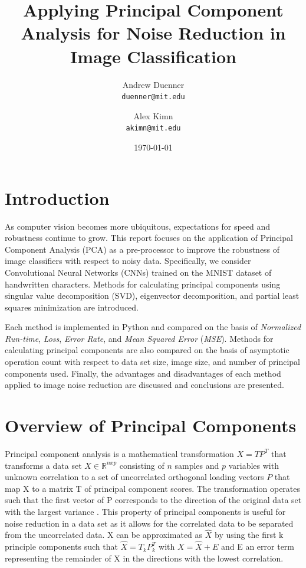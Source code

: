 \documentclass[12pt]{article}
\title{Applying Principal Component Analysis for Noise Reduction in Image Classification
}
\author{Andrew Duenner \\\texttt{duenner@mit.edu} \and Alex Kimn \\\texttt{akimn@mit.edu}}
\date{\today}
\begin{document}
\maketitle

\pagebreak
\tableofcontents

\pagebreak
\section{Introduction}\label{1}
As computer vision becomes more ubiquitous, expectations for speed and robustness continue to grow. This report focuses on the application of Principal Component Analysis (PCA) as a pre-processor to improve the robustness of image classifiers with respect to noisy data. Specifically, we consider Convolutional Neural Networks (CNNs) trained on the MNIST dataset of handwritten characters. Methods for calculating principal components using singular value decomposition (SVD), eigenvector decomposition, and partial least squares minimization are introduced. 

Each method is implemented in Python and compared on the basis of \textit{Normalized Run-time}, \textit{Loss},  \textit{Error Rate}, and \textit{Mean Squared Error} (\textit{MSE}). Methods for calculating principal components are also compared on the basis of asymptotic operation count with respect to data set size, image size, and number of principal components used. Finally, the advantages and disadvantages of each method applied to image noise reduction are discussed and conclusions are presented.


\section{Overview of Principal Components}\label{2}
Principal component analysis is a mathematical transformation $X=TP^T$ that transforms a data set $X \in \mathbb{R}^{nxp}$ consisting of $n$ samples and $p$ variables with unknown correlation to a set of uncorrelated orthogonal loading vectors $P$  that map X to a matrix T of principal component scores. The transformation operates such that the first vector of P corresponds to the direction of the original data set with the largest variance \cite{jolliffe1986principal}. This property of principal components is useful for noise reduction in a data set as it allows for the correlated data to be separated from the uncorrelated data. X can be approximated as $\hat{X}$ by using the first k principle components such that $\hat{X}=T_kP_k^T$ with $X=\hat{X}+E$ and E an error term representing the remainder of X in the directions with the lowest correlation.
\end{document}
